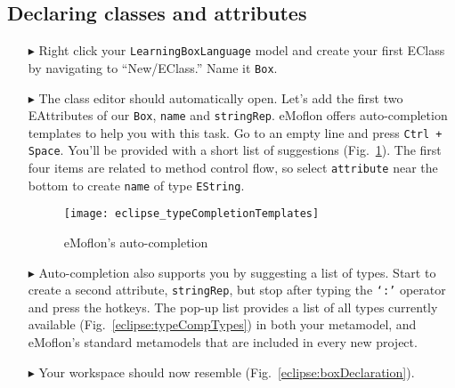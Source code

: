 \newpage
\hypertarget{static:classes tex}{}
\subsection{Declaring classes and attributes}
\texHeader

\begin{itemize}

\item[$\blacktriangleright$] Right click your \texttt{LearningBoxLanguage} model and create your first EClass by navigating to ``New/EClass.'' Name it
\texttt{Box}.

\vspace{0.5cm}

\item[$\blacktriangleright$] The class editor should automatically open. Let's add the first two EAttributes of our \texttt{Box}, \texttt{name} and
\texttt{stringRep}. eMoflon offers auto-completion templates to help you with
this task. Go to an empty line and press \texttt{Ctrl + Space}. You'll be
provided with a short list of suggestions (Fig.~\ref{eclipse:typeCompTempl}).
The first four items are related to method control flow, so select \texttt{attribute} near
the bottom to create \texttt{name} of type \texttt{EString}.

\vspace{0.5cm}

\begin{figure}[htbp]
	\centering
  \texttt{[image: eclipse\_typeCompletionTemplates]}
	\caption{eMoflon's auto-completion}
	\label{eclipse:typeCompTempl}
\end{figure} 

\vspace{0.5cm}

\item[$\blacktriangleright$] Auto-completion also supports you by suggesting a list of types. Start to create a second attribute, \texttt{stringRep}, but
stop after typing the \texttt{`:'} operator and press the hotkeys. The pop-up list provides a list of all types currently available
(Fig.~\ref{eclipse:typeCompTypes}) in both your metamodel, and eMoflon's standard metamodels that are included in every new project.

\vspace{0.5cm}

\item[$\blacktriangleright$] Your workspace should now resemble (Fig.~\ref{eclipse:boxDeclaration}).


\end{itemize}
